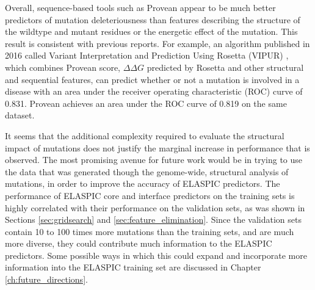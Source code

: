 Overall, sequence-based tools such as Provean appear to be much better predictors of mutation deleteriousness than features describing the structure of the wildtype and mutant residues or the energetic effect of the mutation. This result is consistent with previous reports. For example, an algorithm published in 2016 called Variant Interpretation and Prediction Using Rosetta (VIPUR) \cite{baugh_robust_2016}, which combines Provean score, $\Delta \Delta G$ predicted by Rosetta and other structural and sequential features, can predict whether or not a mutation is involved in a disease with an area under the receiver operating characteristic (ROC) curve of 0.831. Provean achieves an area under the ROC curve of 0.819 on the same dataset.

It seems that the additional complexity required to evaluate the structural impact of mutations does not justify the marginal increase in performance that is observed. The most promising avenue for future work would be in trying to use the data that was generated though the genome-wide, structural analysis of mutations, in order to improve the accuracy of ELASPIC predictors. The performance of ELASPIC core and interface predictors on the training sets is highly correlated with their performance on the validation sets, as was shown in Sections \ref{sec:gridsearch} and \ref{sec:feature_elimination}. Since the validation sets contain 10 to 100 times more mutations than the training sets, and are much more diverse, they could contribute much information to the ELASPIC predictors. Some possible ways in which this could expand and incorporate more information into the ELASPIC training set are discussed in Chapter \ref{ch:future_directions}.
